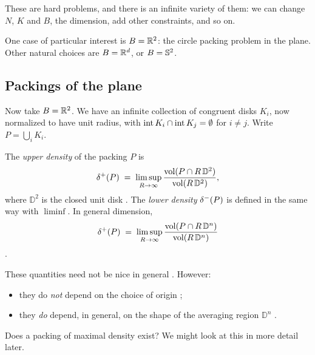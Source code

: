 These are hard problems, and there is an infinite variety of them: we can change
$N$, $K$ and $B$, the dimension, add other constraints, and so on.

One case of particular interest is $B=\mathbb{R}^2$: the circle packing problem in the
plane. Other natural choices are $B=\mathbb{R}^d$, or $B=\mathbb{S}^2$.

\subsection{Packings of the plane}
\label{L1:subsec:plane}

Now take $B=\mathbb{R}^2$. We have an infinite collection of congruent disks $K_i$, now
normalized to have unit radius, with $\operatorname{int} K_i\cap\operatorname{int} K_j=\emptyset$ for $i\ne j$.
Write $P=\bigcup_i K_i$.

\begin{definition}
\label{L1:def:density}
The \emph{upper density} of the packing $P$ is
\[
  \delta^+(P)\;=\;\limsup_{R\to\infty}\frac{\operatorname{vol}(P\cap R\,\mathbb{D}^2)}{\operatorname{vol}(R\,\mathbb{D}^2)},
\]
where $\mathbb{D}^2$ is the closed unit disk .
The \emph{lower density} $\delta^-(P)$ is defined in the same way with $\liminf$.
In general dimension,
\[
  \delta^+(P)\;=\;\limsup_{R\to\infty}\frac{\operatorname{vol}(P\cap R\,\mathbb{D}^n)}{\operatorname{vol}(R\,\mathbb{D}^n)}
\]
.
\end{definition}

\begin{remark}
These quantities need not be nice in general . However:
\begin{itemize}[nosep]
  \item they do \emph{not} depend on the choice of origin ;
  \item they \emph{do} depend, in general, on the shape of the averaging region
        $\mathbb{D}^n$ .
\end{itemize}
\end{remark}

Does a packing of maximal density exist? We might look at this in more detail later.

